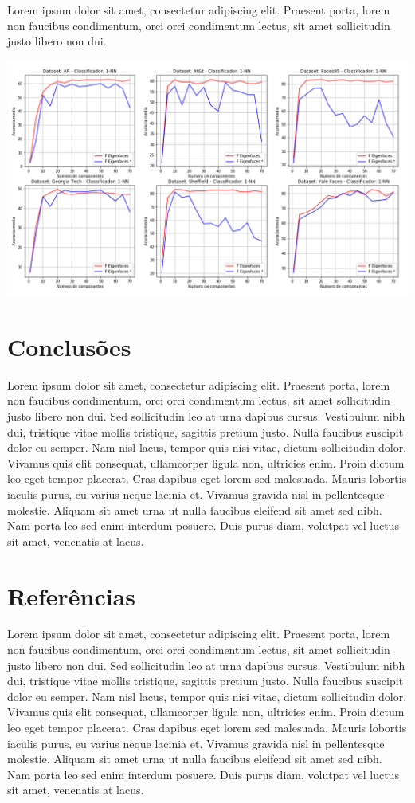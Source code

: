 \documentclass[12pt]{article}
\begin{document}
Lorem ipsum dolor sit amet, consectetur adipiscing elit. Praesent porta, lorem non faucibus condimentum, orci orci condimentum lectus, sit amet sollicitudin justo libero non dui. 

\includegraphics[scale=0.5]{resultados.png}

\section{Conclusões}

Lorem ipsum dolor sit amet, consectetur adipiscing elit. Praesent porta, lorem non faucibus condimentum, orci orci condimentum lectus, sit amet sollicitudin justo libero non dui. Sed sollicitudin leo at urna dapibus cursus. Vestibulum nibh dui, tristique vitae mollis tristique, sagittis pretium justo. Nulla faucibus suscipit dolor eu semper. Nam nisl lacus, tempor quis nisi vitae, dictum sollicitudin dolor. Vivamus quis elit consequat, ullamcorper ligula non, ultricies enim. Proin dictum leo eget tempor placerat. Cras dapibus eget lorem sed malesuada. Mauris lobortis iaculis purus, eu varius neque lacinia et. Vivamus gravida nisl in pellentesque molestie. Aliquam sit amet urna ut nulla faucibus eleifend sit amet sed nibh. Nam porta leo sed enim interdum posuere. Duis purus diam, volutpat vel luctus sit amet, venenatis at lacus. 

\section{Referências}

Lorem ipsum dolor sit amet, consectetur adipiscing elit. Praesent porta, lorem non faucibus condimentum, orci orci condimentum lectus, sit amet sollicitudin justo libero non dui. Sed sollicitudin leo at urna dapibus cursus. Vestibulum nibh dui, tristique vitae mollis tristique, sagittis pretium justo. Nulla faucibus suscipit dolor eu semper. Nam nisl lacus, tempor quis nisi vitae, dictum sollicitudin dolor. Vivamus quis elit consequat, ullamcorper ligula non, ultricies enim. Proin dictum leo eget tempor placerat. Cras dapibus eget lorem sed malesuada. Mauris lobortis iaculis purus, eu varius neque lacinia et. Vivamus gravida nisl in pellentesque molestie. Aliquam sit amet urna ut nulla faucibus eleifend sit amet sed nibh. Nam porta leo sed enim interdum posuere. Duis purus diam, volutpat vel luctus sit amet, venenatis at lacus. 
\end{document}
